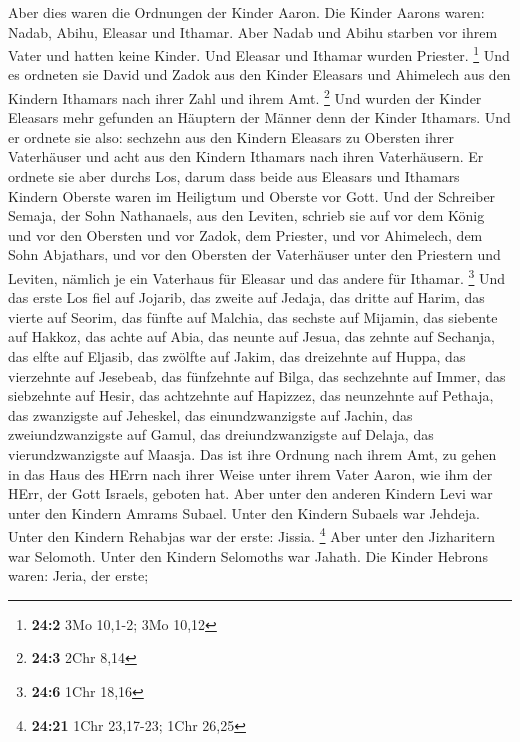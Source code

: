  Aber dies waren die Ordnungen der Kinder Aaron. Die
Kinder Aarons waren: Nadab, Abihu, Eleasar und Ithamar. 
Aber Nadab und Abihu starben vor ihrem Vater und hatten keine Kinder.
Und Eleasar und Ithamar wurden Priester. \footnote{\textbf{24:2} 3Mo
  10,1-2; 3Mo 10,12}  Und es ordneten sie David und Zadok
aus den Kinder Eleasars und Ahimelech aus den Kindern Ithamars nach
ihrer Zahl und ihrem Amt. \footnote{\textbf{24:3} 2Chr 8,14}
 Und wurden der Kinder Eleasars mehr gefunden an Häuptern
der Männer denn der Kinder Ithamars. Und er ordnete sie also: sechzehn
aus den Kindern Eleasars zu Obersten ihrer Vaterhäuser und acht aus den
Kindern Ithamars nach ihren Vaterhäusern.  Er ordnete sie
aber durchs Los, darum dass beide aus Eleasars und Ithamars Kindern
Oberste waren im Heiligtum und Oberste vor Gott.  Und der
Schreiber Semaja, der Sohn Nathanaels, aus den Leviten, schrieb sie auf
vor dem König und vor den Obersten und vor Zadok, dem Priester, und vor
Ahimelech, dem Sohn Abjathars, und vor den Obersten der Vaterhäuser
unter den Priestern und Leviten, nämlich je ein Vaterhaus für Eleasar
und das andere für Ithamar. \footnote{\textbf{24:6} 1Chr 18,16}
 Und das erste Los fiel auf Jojarib, das zweite auf
Jedaja,  das dritte auf Harim, das vierte auf Seorim,
 das fünfte auf Malchia, das sechste auf Mijamin,
 das siebente auf Hakkoz, das achte auf Abia,
 das neunte auf Jesua, das zehnte auf Sechanja,
 das elfte auf Eljasib, das zwölfte auf Jakim,
 das dreizehnte auf Huppa, das vierzehnte auf Jesebeab,
 das fünfzehnte auf Bilga, das sechzehnte auf Immer,
 das siebzehnte auf Hesir, das achtzehnte auf Hapizzez,
 das neunzehnte auf Pethaja, das zwanzigste auf Jeheskel,
 das einundzwanzigste auf Jachin, das zweiundzwanzigste
auf Gamul,  das dreiundzwanzigste auf Delaja, das
vierundzwanzigste auf Maasja.  Das ist ihre Ordnung nach
ihrem Amt, zu gehen in das Haus des HErrn nach ihrer Weise unter ihrem
Vater Aaron, wie ihm der HErr, der Gott Israels, geboten hat.
 Aber unter den anderen Kindern Levi war unter den
Kindern Amrams Subael. Unter den Kindern Subaels war Jehdeja.
 Unter den Kindern Rehabjas war der erste: Jissia.
\footnote{\textbf{24:21} 1Chr 23,17-23; 1Chr 26,25}  Aber
unter den Jizharitern war Selomoth. Unter den Kindern Selomoths war
Jahath.  Die Kinder Hebrons waren: Jeria, der erste;
